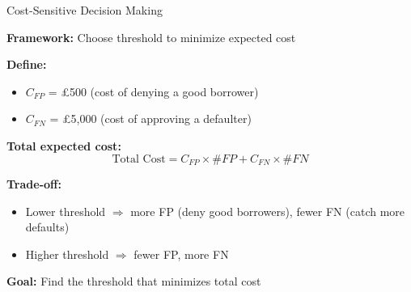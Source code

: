 \documentclass[10pt]{beamer}
\begin{document}
\begin{frame}{Cost-Sensitive Decision Making}

  \textbf{Framework:} Choose threshold to minimize expected cost

  \vspace{1em}
  \textbf{Define:}
  \begin{itemize}
    \item $C_{FP}$ = \pounds 500 (cost of denying a good borrower)
    \item $C_{FN}$ = \pounds 5,000 (cost of approving a defaulter)
  \end{itemize}

  \vspace{0.5em}
  \textbf{Total expected cost:}
  \[
  \text{Total Cost} = C_{FP} \times \#FP + C_{FN} \times \#FN
  \]

  \vspace{1em}
  \textbf{Trade-off:}
  \begin{itemize}
    \item Lower threshold $\Rightarrow$ more FP (deny good borrowers), fewer FN (catch more defaults)
    \item Higher threshold $\Rightarrow$ fewer FP, more FN
  \end{itemize}

  \vspace{0.5em}
  \textbf{Goal:} Find the threshold that minimizes total cost
\end{frame}

\end{document}
